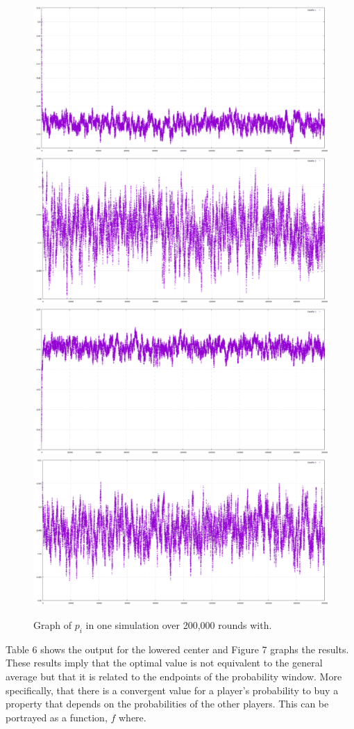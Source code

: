 \documentclass{article}
\begin{document}
\begin{figure}[htp]
\centering
\includegraphics[width=.75\textwidth]{images/ai99lowprobside1}\hfill
\includegraphics[width=.75\textwidth]{images/ai99lowprobside2}\hfill
\includegraphics[width=.75\textwidth]{images/ai99lowprobside3}\hfill
\includegraphics[width=.75\textwidth]{images/ai99lowprobside4}
\caption{Graph of $p_i$ in one simulation over 200,000 rounds with.}
\label{fig:figure3}
\end{figure}

Table 6 shows the output for the lowered center and Figure 7 graphs the results.  These results imply that the optimal value is not equivalent to the general average but that it is related to the endpoints of the probability window.  More specifically, that there is a convergent value for a player's probability to buy a property that depends on the probabilities of the other players.  This can be portrayed as a function, $f$ where.
\end{document}
